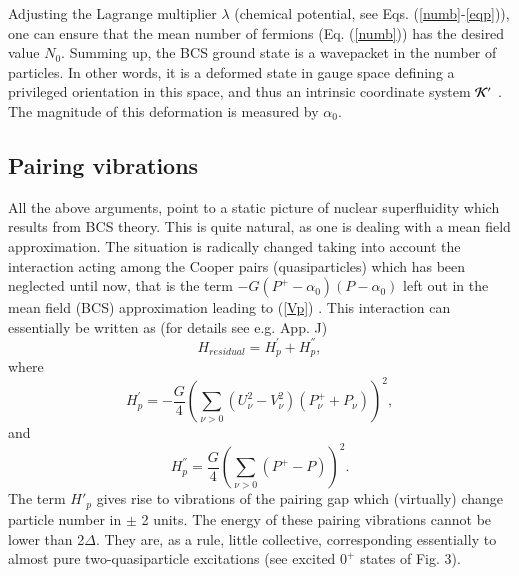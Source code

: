 \documentclass[a4paper,14pt]{book}
\begin{document}
Adjusting the Lagrange multiplier $\lambda$ (chemical potential, see Eqs. (\ref{numb}-\ref{eqp})), one can ensure that the mean number of fermions 
(Eq. (\ref{numb})) has the desired value $N_0$.
Summing up, the BCS ground state is a wavepacket in the number of particles. In other words, it is a deformed state in gauge space  defining a privileged 
orientation in this space, and thus an intrinsic coordinate system ${\cal K'}$ \cite{Anderson:58, Bohr:88,Bes:66}.
The magnitude of this deformation is measured by $\alpha_0$.

\subsection{Pairing vibrations}
 
All the above arguments, point to a static picture of nuclear superfluidity which results from BCS theory. This is quite 
natural, as one is dealing with a mean field approximation.
The situation is radically changed  taking into account the interaction 
acting among the Cooper pairs (quasiparticles) which has been neglected until now, that is the term
$- G (P^+ -\alpha_0)(P-\alpha_0)$ left out in the mean field (BCS) approximation leading to (\ref{Vp}) \cite{Anderson:58,Bes:66}.
This interaction can essentially be written as (for details see e.g. \cite{Brink:05} App. J)
\begin{equation}
H_{residual} = H^{'}_p + H^{''}_p,
\end{equation} 
where 
\begin{equation}
H^{'}_p = - \frac{G}{4} 
\left( \sum_{\nu>0} (U^2_{\nu} - V^2_{\nu})(P^+_{\nu} + P_{\nu}) \right)^2,
\end{equation}
and 
\begin{equation}
H_p^{''} = \frac{G}{4} \left( \sum_{\nu>0} (P^+ - P) \right)^2.
\end{equation}
The term $H'_p$ gives rise to vibrations of the pairing gap  which (virtually) change particle number in $\pm$ 2 units. The energy
of these pairing vibrations cannot be lower than 2$\Delta$. They are, as a rule, little collective, corresponding  essentially 
to almost pure two-quasiparticle excitations (see excited $0^+$ states of Fig. 3).
\end{document}
